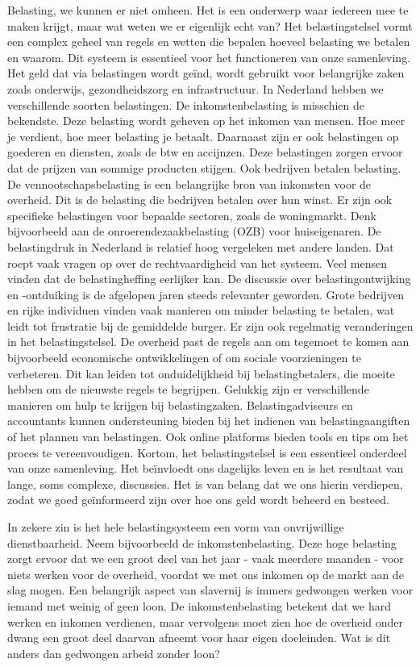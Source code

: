 \documentclass[
  a5paper,
  smalldemyvopaper,10pt,twoside,onecolumn,openright,extrafontsizes,hidelinks]{memoir}
\begin{document}
Belasting, we kunnen er niet omheen. Het is een onderwerp waar iedereen
mee te maken krijgt, maar wat weten we er eigenlijk echt van? Het
belastingstelsel vormt een complex geheel van regels en wetten die
bepalen hoeveel belasting we betalen en waarom. Dit systeem is
essentieel voor het functioneren van onze samenleving. Het geld dat via
belastingen wordt geïnd, wordt gebruikt voor belangrijke zaken zoals
onderwijs, gezondheidszorg en infrastructuur. In Nederland hebben we
verschillende soorten belastingen. De inkomstenbelasting is misschien de
bekendste. Deze belasting wordt geheven op het inkomen van mensen. Hoe
meer je verdient, hoe meer belasting je betaalt. Daarnaast zijn er ook
belastingen op goederen en diensten, zoals de btw en accijnzen. Deze
belastingen zorgen ervoor dat de prijzen van sommige producten stijgen.
Ook bedrijven betalen belasting. De vennootschapsbelasting is een
belangrijke bron van inkomsten voor de overheid. Dit is de belasting die
bedrijven betalen over hun winst. Er zijn ook specifieke belastingen
voor bepaalde sectoren, zoals de woningmarkt. Denk bijvoorbeeld aan de
onroerendezaakbelasting (OZB) voor huiseigenaren. De belastingdruk in
Nederland is relatief hoog vergeleken met andere landen. Dat roept vaak
vragen op over de rechtvaardigheid van het systeem. Veel mensen vinden
dat de belastingheffing eerlijker kan. De discussie over
belastingontwijking en -ontduiking is de afgelopen jaren steeds
relevanter geworden. Grote bedrijven en rijke individuen vinden vaak
manieren om minder belasting te betalen, wat leidt tot frustratie bij de
gemiddelde burger. Er zijn ook regelmatig veranderingen in het
belastingstelsel. De overheid past de regels aan om tegemoet te komen
aan bijvoorbeeld economische ontwikkelingen of om sociale voorzieningen
te verbeteren. Dit kan leiden tot onduidelijkheid bij belastingbetalers,
die moeite hebben om de nieuwste regels te begrijpen. Gelukkig zijn er
verschillende manieren om hulp te krijgen bij belastingzaken.
Belastingadviseurs en accountants kunnen ondersteuning bieden bij het
indienen van belastingaangiften of het plannen van belastingen. Ook
online platforms bieden tools en tips om het proces te vereenvoudigen.
Kortom, het belastingstelsel is een essentieel onderdeel van onze
samenleving. Het beïnvloedt ons dagelijks leven en is het resultaat van
lange, soms complexe, discussies. Het is van belang dat we ons hierin
verdiepen, zodat we goed geïnformeerd zijn over hoe ons geld wordt
beheerd en besteed.

In zekere zin is het hele belastingsysteem een vorm van onvrijwillige
dienstbaarheid. Neem bijvoorbeeld de inkomstenbelasting. Deze hoge
belasting zorgt ervoor dat we een groot deel van het jaar - vaak
meerdere maanden - voor niets werken voor de overheid, voordat we met
ons inkomen op de markt aan de slag mogen. Een belangrijk aspect van
slavernij is immers gedwongen werken voor iemand met weinig of geen
loon. De inkomstenbelasting betekent dat we hard werken en inkomen
verdienen, maar vervolgens moet zien hoe de overheid onder dwang een
groot deel daarvan afneemt voor haar eigen doeleinden. Wat is dit anders
dan gedwongen arbeid zonder loon?
\end{document}
